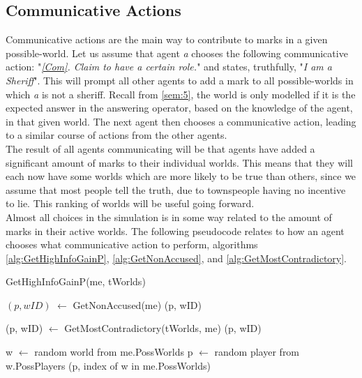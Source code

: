 \subsection{Communicative Actions}\label{CommunicativeActions}
Communicative actions are the main way to contribute to marks in a given
possible-world. Let us assume that agent \textit{a} chooses the following
communicative action: "\textit{\ref{Com}. Claim to have a certain role.}" and
states, truthfully, "\textit{I am a Sheriff}". This will prompt all other
agents to add a mark to all possible-worlds in which \textit{a} is not a
sheriff. Recall from \cref{sem:5}, the world is only modelled if it is the
expected answer in the answering operator, based on the knowledge of the agent,
in that given world. The next agent then chooses a communicative action,
leading to a similar course of actions from the other agents.  \\ The result of all agents communicating will be that agents have
added a significant amount of marks to their individual worlds. This means that
they will each now have some worlds which are more likely to be true than
others, since we assume that most people tell the truth, due to townspeople
having no incentive to lie. This ranking of worlds will be useful going
forward.\\ Almost all choices in the simulation is in some way related to the
amount of marks in their active worlds. The following pseudocode relates to how
an agent chooses what communicative action to perform, algorithms
\ref{alg:GetHighInfoGainP}, \ref{alg:GetNonAccused}, and
\ref{alg:GetMostContradictory}. 
\begin{algorithm}[H]
	\caption{GetHighInfoGainP(me, tWorlds)}
	\begin{algorithmic}
		\State $(p, wID)$ $\gets$ GetNonAccused(me)
		\State \Return (p, wID)
		\EndIf
		\EndIf

		\State (p, wID) $\gets$ GetMostContradictory(tWorlds, me)
		\State \Return (p, wID)
		\EndIf

		\State w $\gets$ random world from me.PossWorlds
		\State p $\gets$ random player from w.PossPlayers
		\State \Return (p, index of w in me.PossWorlds)
		\label{alg:GetHighInfoGainP}
	\end{algorithmic}
\end{algorithm}
\vspace{-30px}
\setcounter{algorithmcaption}{0}
